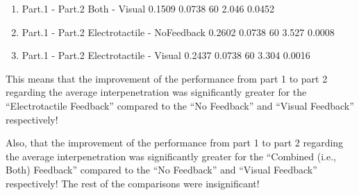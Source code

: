 \documentclass[
]{article}
\begin{document}
\begin{enumerate}
\def\labelenumi{\arabic{enumi})}
\setcounter{enumi}{1}
\item
  Part.1 - Part.2 Both - Visual 0.1509 0.0738 60 2.046 0.0452
\item
  Part.1 - Part.2 Electrotactile - NoFeedback 0.2602 0.0738 60 3.527
  0.0008
\item
  Part.1 - Part.2 Electrotactile - Visual 0.2437 0.0738 60 3.304 0.0016
\end{enumerate}

This means that the improvement of the performance from part 1 to part 2
regarding the average interpenetration was significantly greater for the
``Electrotactile Feedback'' compared to the ``No Feedback'' and ``Visual
Feedback'' respectively!

Also, that the improvement of the performance from part 1 to part 2
regarding the average interpenetration was significantly greater for the
``Combined (i.e., Both) Feedback'' compared to the ``No Feedback'' and
``Visual Feedback'' respectively! The rest of the comparisons were
insignificant!
\end{document}
